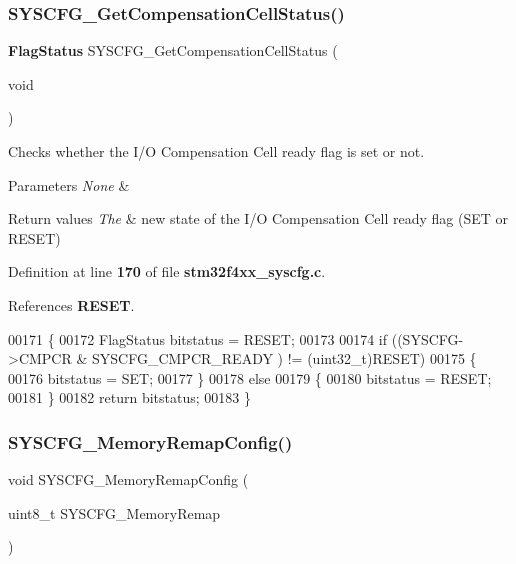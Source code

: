 \subsubsection{S\+Y\+S\+C\+F\+G\+\_\+\+Get\+Compensation\+Cell\+Status()}
{\footnotesize\ttfamily \textbf{ Flag\+Status} S\+Y\+S\+C\+F\+G\+\_\+\+Get\+Compensation\+Cell\+Status (\begin{DoxyParamCaption}\item[{void}]{ }\end{DoxyParamCaption})}



Checks whether the I/O Compensation Cell ready flag is set or not. 


\begin{DoxyParams}{Parameters}
{\em None} & \\
\hline
\end{DoxyParams}

\begin{DoxyRetVals}{Return values}
{\em The} & new state of the I/O Compensation Cell ready flag (S\+ET or R\+E\+S\+ET) \\
\hline
\end{DoxyRetVals}


Definition at line \textbf{ 170} of file \textbf{ stm32f4xx\+\_\+syscfg.\+c}.



References \textbf{ R\+E\+S\+ET}.


\begin{DoxyCode}
00171 \{
00172   FlagStatus bitstatus = RESET;
00173     
00174   \textcolor{keywordflow}{if} ((SYSCFG->CMPCR & SYSCFG_CMPCR_READY ) != (uint32\_t)RESET)
00175   \{
00176     bitstatus = SET;
00177   \}
00178   \textcolor{keywordflow}{else}
00179   \{
00180     bitstatus = RESET;
00181   \}
00182   \textcolor{keywordflow}{return} bitstatus;
00183 \}
\end{DoxyCode}
\mbox{\label{group__SYSCFG__Private__Functions_ga09a5712f6c66ba5f0e0eeba30bc1e20d}} 
\subsubsection{S\+Y\+S\+C\+F\+G\+\_\+\+Memory\+Remap\+Config()}
{\footnotesize\ttfamily void S\+Y\+S\+C\+F\+G\+\_\+\+Memory\+Remap\+Config (\begin{DoxyParamCaption}\item[{uint8\+\_\+t}]{S\+Y\+S\+C\+F\+G\+\_\+\+Memory\+Remap }\end{DoxyParamCaption})}



